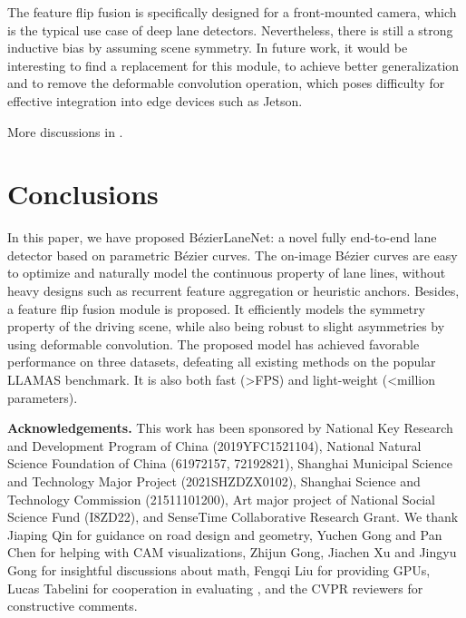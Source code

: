 \documentclass[10pt,twocolumn,letterpaper]{article}
\begin{document}
The feature flip fusion is specifically designed for a front-mounted camera, which is the typical use case of deep lane detectors. Nevertheless, there is still a strong inductive bias by assuming scene symmetry. In future work, it would be interesting to find a replacement for this module, to achieve better generalization and to remove the deformable convolution operation, which poses difficulty for effective integration into edge devices such as Jetson.

More discussions in .


\section{Conclusions}
\label{sec:concl}




In this paper, we have proposed BézierLaneNet: a novel fully end-to-end lane detector based on parametric Bézier curves. The on-image Bézier curves are easy to optimize and naturally model the continuous property of lane lines, without heavy designs such as recurrent feature aggregation or heuristic anchors. Besides, a feature flip fusion module is proposed. It efficiently models the symmetry property of the driving scene, while also being robust to slight asymmetries by using deformable convolution. The proposed model has achieved favorable performance on three datasets, defeating all existing methods on the popular LLAMAS benchmark. It is also both fast (\textgreater  FPS) and light-weight (\textless  million parameters).


\noindent \textbf{Acknowledgements.} This work has been sponsored by National Key Research and Development Program of China (2019YFC1521104), National Natural Science Foundation of China (61972157, 72192821), Shanghai Municipal Science and Technology Major Project (2021SHZDZX0102), Shanghai Science and Technology Commission (21511101200), Art major project of National Social Science Fund (I8ZD22), and SenseTime Collaborative Research Grant. We thank Jiaping Qin for guidance on road design and geometry, Yuchen Gong and Pan Chen for helping with CAM visualizations, Zhijun Gong, Jiachen Xu and Jingyu Gong for insightful discussions about math, Fengqi Liu for providing GPUs, Lucas Tabelini for cooperation in evaluating \cite{tabelini2021polylanenet,tabelini2021keep}, and the CVPR reviewers for constructive comments.

{\small


}
\end{document}

